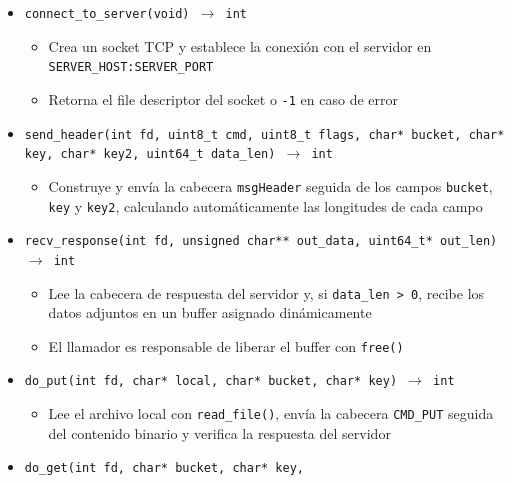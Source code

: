 \documentclass[12pt, letterpaper]{article}
\begin{document}
\begin{itemize}
    \subsection*{Helpers de red y sistema de archivos}
    \item \texttt{connect\_to\_server(void) $\to$ int}
        \begin{itemize}
            \item Crea un socket TCP y establece la conexión con el 
                  servidor en \texttt{SERVER\_HOST:SERVER\_PORT}
            \item Retorna el file descriptor del socket o \texttt{-1} 
                  en caso de error
        \end{itemize}
    \item \texttt{send\_header(int fd, uint8\_t cmd, uint8\_t flags, 
          char* bucket, char* key, char* key2, uint64\_t data\_len) $\to$ int}
        \begin{itemize}
            \item Construye y envía la cabecera \texttt{msgHeader} 
                  seguida de los campos \texttt{bucket}, \texttt{key} 
                  y \texttt{key2}, calculando automáticamente las 
                  longitudes de cada campo
        \end{itemize}
    \item \texttt{recv\_response(int fd, unsigned char** out\_data, 
          uint64\_t* out\_len) $\to$ int}
        \begin{itemize}
            \item Lee la cabecera de respuesta del servidor y, si 
                  \texttt{data\_len > 0}, recibe los datos adjuntos en 
                  un buffer asignado dinámicamente
            \item El llamador es responsable de liberar el buffer con 
                  \texttt{free()}
        \end{itemize}
    \item \texttt{do\_put(int fd, char* local, char* bucket, 
          char* key) $\to$ int}
        \begin{itemize}
            \item Lee el archivo local con \texttt{read\_file()}, envía 
                  la cabecera \texttt{CMD\_PUT} seguida del contenido 
                  binario y verifica la respuesta del servidor
        \end{itemize}
    \item \texttt{do\_get(int fd, char* bucket, char* key, 
}
\end{itemize}
\end{document}
